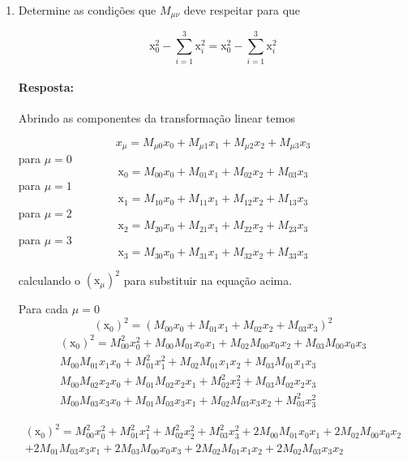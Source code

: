 \documentclass[10pt,a4paper]{article}
\begin{document}
	\begin{enumerate}
		\item Determine as condições que $ M_{\mu\nu} $ deve respeitar para que
		
		$$ \text{\~{x}}^2_0 - \sum_{i=1}^{3} \text{\~{x}}^2_i = \text{x}^2_0 - \sum_{i=1}^{3} \text{x}^2_i $$
	
	\paragraph{Resposta:}
	Abrindo as componentes da transformação linear temos
	
	$$ x_\mu = M_{\mu0} x_0 + M_{\mu1} x_1+M_{\mu2} x_2+M_{\mu3} x_3 $$
	para $ \mu =0 $
	$$ \text{\~{x}}_0 = M_{00} x_0 + M_{01} x_1+M_{02} x_2+M_{03} x_3 $$
	para $ \mu =1 $
	$$ \text{\~{x}}_1 = M_{10} x_0 + M_{11} x_1+M_{12} x_2+M_{13} x_3 $$
	para $ \mu =2 $
	$$\text{\~{x}}_2 = M_{20} x_0 + M_{21} x_1+M_{22} x_2+M_{23} x_3 $$
	para $ \mu =3 $
	$$ \text{\~{x}}_3 = M_{30} x_0 + M_{31} x_1+M_{32} x_2+M_{33} x_3 $$
	 
	 calculando o $( \text{\~{x}}_\mu)^2 $ para substituir na equação acima.
	 
	 Para cada $ \mu=0 $
	 $$ (\text{\~{x}}_0)^2 =  (M_{00} x_0 + M_{01} x_1+M_{02} x_2+M_{03} x_3)^2 $$
	 \begin{equation}\nonumber
	 	\begin{split}
	 		(\text{\~{x}}_0)^2 =  M_{00}^2 x_0^2 + M_{00}M_{01} x_0x_1+M_{02}M_{00} x_0 x_2+M_{03}M_{00} x_0 x_3\\ 
	 		M_{00}M_{01} x_1 x_0 + M_{01}^2 x_1^2+M_{02}M_{01} x_1 x_2+M_{03}M_{01} x_1 x_3\\
	 		M_{00}M_{02} x_2 x_0 + M_{01}M_{02} x_2 x_1+M_{02}^2x_2^2+M_{03} M_{02} x_2x_3\\
	 		M_{00}M_{03} x_3 x_0 + M_{01}M_{03} x_3 x_1+M_{02}M_{03} x_3 x_2+M_{03}^2 x_3^2
	 	\end{split}
	 \end{equation}
 
	 \begin{equation}\nonumber
	 	\begin{split}
	 		(\text{\~{x}}_0)^2 =  M_{00}^2 x_0^2 +M_{01}^2 x_1^2+M_{02}^2x_2^2+M_{03}^2 x_3^2+ 2M_{00}M_{01} x_0x_1+2M_{02}M_{00} x_0 x_2\\+2M_{01}M_{03} x_3 x_1+2M_{03}M_{00} x_0 x_3+2M_{02}M_{01} x_1 x_2+2M_{02}M_{03} x_3 x_2
	 	\end{split}
	 \end{equation}
 

\end{enumerate}
\end{document}
